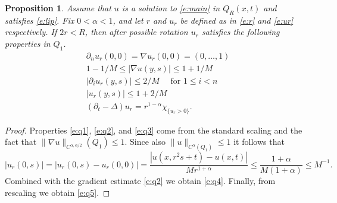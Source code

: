 \documentclass{amsart}
\newtheorem{proposition}[theorem]{Proposition}
\numberwithin{equation}{section}
\begin{document}
 \begin{proposition} \label{p:rescale}
  Assume that $u$ is a solution to \eqref{e:main} in $Q_{R}(x,t)$ and satisfies \eqref{e:lip}. Fix $0<\alpha<1$, and let $r$ and $u_r$ be defined as in \eqref{e:r} and \eqref{e:ur} respectively. If $2r < R$, then after possible rotation $u_r$ satisfies the following properties in $Q_1$. 
  \begin{align}
     &\partial_n u_r(0,0)= \nabla u_r(0,0)=(0,\ldots,1) \label{e:q1}\\
     &1-1/M \leq |\nabla u(y,s)|\leq 1+1/M \label{e:q2}\\
     & |\partial_i u_r(y,s)|\leq 2/M \label{e:q3} \quad \text{ for } 1\leq i <n \\
     & |u_r(y,s)|\leq 1+2/M \label{e:q4} \\
     & (\partial_t - \Delta)u_r = r^{1-\alpha} \chi_{\{u_r>0\}}\label{e:q5}.
 \end{align}
 \end{proposition}
 
 \begin{proof}
  Properties \eqref{e:q1}, \eqref{e:q2}, and \eqref{e:q3} come from the standard scaling and the fact that $\| \nabla u \|_{C^{\alpha,\alpha/2}}(Q_1) \leq 1$. Since also 
  $\| u \|_{C^{\alpha}(Q_1)} \leq 1$ it follows that 
  \[
  |u_r(0,s)|=|u_r(0,s)-u_r(0,0)|=\frac{|u(x,r^2s+t) -u(x,t)|}{Mr^{1+\alpha}}
  \leq \frac{1+\alpha}{M(1+\alpha)} \leq M^{-1}. 
  \]
  Combined with the gradient estimate \eqref{e:q2} we obtain \eqref{e:q4}. 
  Finally, from rescaling we obtain \eqref{e:q5}. 
 \end{proof}
 
\end{document}
